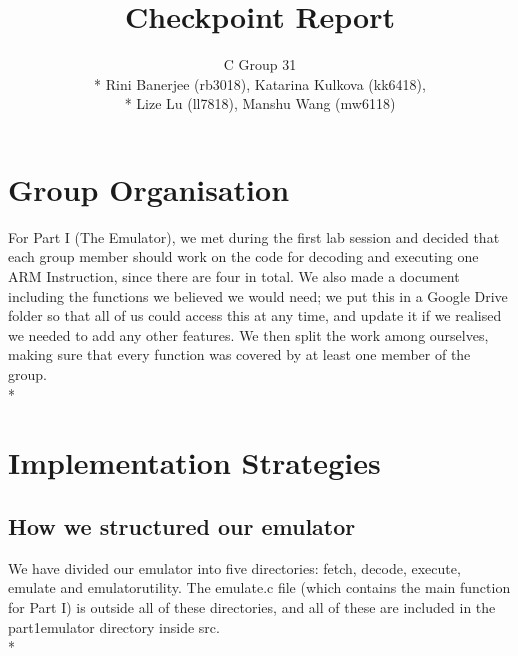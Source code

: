 \documentclass[letterpaper,11pt]{article}
\begin{document}
\title{Checkpoint Report}
\author{C Group 31\\* Rini Banerjee (rb3018), Katarina Kulkova (kk6418),\\* Lize Lu (ll7818), Manshu Wang (mw6118)}
\date{}
\maketitle

\section{Group Organisation}
For Part I (The Emulator), we met during the first lab session and decided that each group member should work on the code for decoding and executing one ARM Instruction, since there are four in total. We also made a document including the functions we believed we would need; we put this in a Google Drive folder so that all of us could access this at any time, and update it if we realised we needed to add any other features. We then split the work among ourselves, making sure that every function was \textquotesingle covered\textquotesingle \-  by at least one member of the group. \\*




\section{Implementation Strategies}
\subsection{How we structured our emulator}
We have divided our emulator into five directories: fetch, decode, execute, emulate and emulatorutility. The emulate.c file (which contains the main function for Part I) is outside all of these directories, and all of these are included in the part1emulator directory inside src.\\*
\end{document}
